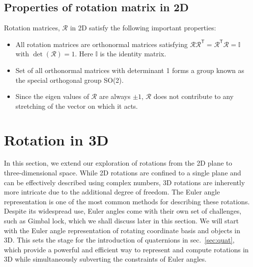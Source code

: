 \documentclass{article}
\def\R{\mathcal{R}}
\def\I{\mathbb{I}}
\def\T{\mathsf{T}}
\begin{document}
\subsection{Properties of rotation matrix in 2D}
Rotation matrices, $\R$ in 2D satisfy the following important properties:
\begin{itemize}
  \item All rotation matrices are orthonormal matrices satisfying $\R \R^\T = \R^\T \R = \I$ with $\det(\R) = 1$. Here $\I$ is the identity matrix.
  \item Set of all orthonormal matrices with determinant 1 forms a group known as the special orthogonal group SO(2).
  \item Since the eigen values of $\R$ are always $\pm 1$, $\R$ does not contribute to any stretching of the vector on which it acts.
\end{itemize}

\section{Rotation in 3D}\label{sec:3D}

In this section, we extend our exploration of rotations from the 2D plane to three-dimensional space. While 2D rotations are confined to a single plane and can be effectively described using complex numbers, 3D rotations are inherently more intricate due to the additional degree of freedom. The Euler angle representation is one of the most common methods for describing these rotations. Despite its widespread use, Euler angles come with their own set of challenges, such as Gimbal lock, which we shall discuss later in this section. We will start with the Euler angle representation of rotating coordinate basis and objects in 3D. This sets the stage for the introduction of quaternions in sec.~\ref{sec:quat}, which provide a powerful and efficient way to represent and compute rotations in 3D while simultaneously subverting the constraints of Euler angles.
\end{document}
